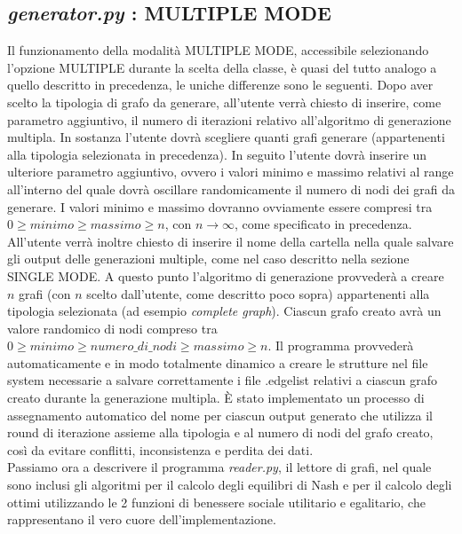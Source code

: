 \subsection{\textit{generator.py} : MULTIPLE MODE}
\justify
Il funzionamento della modalità MULTIPLE MODE, accessibile selezionando l'opzione MULTIPLE durante la scelta della classe, è quasi del tutto analogo a quello descritto in precedenza, le uniche differenze sono le seguenti. Dopo aver scelto la tipologia di grafo da generare, all'utente verrà chiesto di inserire, come parametro aggiuntivo, il numero di iterazioni relativo all'algoritmo di generazione multipla. In sostanza l'utente dovrà scegliere quanti grafi generare (appartenenti alla tipologia selezionata in precedenza). In seguito l'utente dovrà inserire un ulteriore parametro aggiuntivo, ovvero i valori minimo e massimo relativi al range all'interno del quale dovrà oscillare randomicamente il numero di nodi dei grafi da generare. I valori minimo e massimo dovranno ovviamente essere compresi tra \(0 \geq minimo \geq massimo \geq n\), con \(n\to\infty\), come specificato in precedenza. All'utente verrà inoltre chiesto di inserire il nome della cartella nella quale salvare gli output delle generazioni multiple, come nel caso descritto nella sezione SINGLE MODE. A questo punto l'algoritmo di generazione provvederà a creare \(n\) grafi (con \(n\) scelto dall'utente, come descritto poco sopra) appartenenti alla tipologia selezionata (ad esempio \textit{complete graph}). Ciascun grafo creato avrà un valore randomico di nodi compreso tra \(0 \geq minimo \geq numero\_di\_nodi \geq massimo \geq n\). Il programma provvederà automaticamente e in modo totalmente dinamico a creare le strutture nel file system necessarie a salvare correttamente i file .edgelist relativi a ciascun grafo creato durante la generazione multipla. È stato implementato un processo di assegnamento automatico del nome per ciascun output generato che utilizza il round di iterazione assieme alla tipologia e al numero di nodi del grafo creato, così da evitare conflitti, inconsistenza e perdita dei dati.\\
Passiamo ora a descrivere il programma \textit{reader.py}, il lettore di grafi, nel quale sono inclusi gli algoritmi per il calcolo degli equilibri di Nash e per il calcolo degli ottimi utilizzando le 2 funzioni di benessere sociale utilitario e egalitario, che rappresentano il vero cuore dell'implementazione.\\

